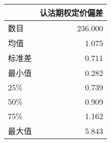 \begin{tabular}{lr}
\toprule
{} &  认沽期权定价偏差 \\
\midrule
数目 &   236.000 \\
均值  &     1.075 \\
标准差   &     0.711 \\
最小值   &     0.282 \\
25\%   &     0.739 \\
50\%   &     0.909 \\
75\%   &     1.162 \\
最大值   &     5.843 \\
\bottomrule
\end{tabular}

